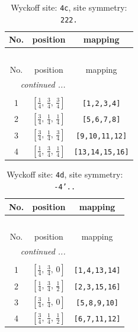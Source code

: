 \documentclass[fleqn,8pt]{jsarticle}
\begin{document}
\renewcommand{\arraystretch}{1.2}
\begin{longtable}{ccc}
\caption{Wyckoff site: {\tt 4c}, site symmetry: {\tt 222.}}
 \\
 \hline \hline
No. & position & mapping \\ \hline \endfirsthead

\multicolumn{2}{l}{\tablename\ \thetable{}} \\
 \hline \hline
No. & position & mapping \\ \hline \endhead

 \hline \hline
\multicolumn{2}{r}{\footnotesize\it continued ...} \\ \endfoot

 \hline \hline
\multicolumn{2}{r}{} \\ \endlastfoot

1 & $\left[ \frac{1}{4},\, \frac{3}{4},\, \frac{3}{4} \right]$ & {\tt [1,2,3,4]} \\ \hline
2 & $\left[ \frac{3}{4},\, \frac{1}{4},\, \frac{1}{4} \right]$ & {\tt [5,6,7,8]} \\ \hline
3 & $\left[ \frac{3}{4},\, \frac{1}{4},\, \frac{3}{4} \right]$ & {\tt [9,10,11,12]} \\ \hline
4 & $\left[ \frac{1}{4},\, \frac{3}{4},\, \frac{1}{4} \right]$ & {\tt [13,14,15,16]} \\
\end{longtable}
\renewcommand{\arraystretch}{1.2}
\begin{longtable}{ccc}
\caption{Wyckoff site: {\tt 4d}, site symmetry: {\tt -4'..}}
 \\
 \hline \hline
No. & position & mapping \\ \hline \endfirsthead

\multicolumn{2}{l}{\tablename\ \thetable{}} \\
 \hline \hline
No. & position & mapping \\ \hline \endhead

 \hline \hline
\multicolumn{2}{r}{\footnotesize\it continued ...} \\ \endfoot

 \hline \hline
\multicolumn{2}{r}{} \\ \endlastfoot

1 & $\left[ \frac{1}{4},\, \frac{3}{4},\, 0 \right]$ & {\tt [1,4,13,14]} \\ \hline
2 & $\left[ \frac{1}{4},\, \frac{3}{4},\, \frac{1}{2} \right]$ & {\tt [2,3,15,16]} \\ \hline
3 & $\left[ \frac{3}{4},\, \frac{1}{4},\, 0 \right]$ & {\tt [5,8,9,10]} \\ \hline
4 & $\left[ \frac{3}{4},\, \frac{1}{4},\, \frac{1}{2} \right]$ & {\tt [6,7,11,12]} \\
\end{longtable}
\end{document}
